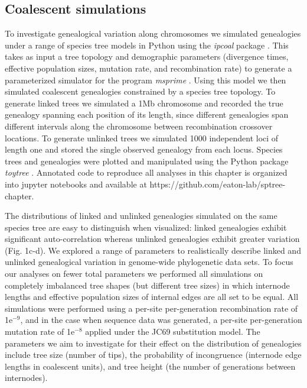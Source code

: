 \documentclass[11pt]{article}
\begin{document}


\subsection{Coalescent simulations}
To investigate genealogical variation along chromosomes we simulated genealogies under a range of species tree models in Python using the \emph{ipcoal} package \citep{mckenzie_ipcoal_2020}. This takes as input a tree topology and demographic parameters (divergence times, effective population sizes, mutation rate, and recombination rate) to generate a parameterized simulator for the program \emph{msprime} \citep{kelleher_efficient_2016}. Using this model we then simulated coalescent genealogies constrained by a species tree topology. To generate linked trees we simulated a 1Mb chromosome and recorded the true genealogy spanning each position of its length, since different genealogies span different intervals along the chromosome between recombination crossover locations. To generate unlinked trees we simulated 1000 independent loci of length one and stored the single observed genealogy from each locus. Species trees and genealogies were plotted and manipulated using the Python package \emph{toytree} \citep{eaton_toytree_2020}. Annotated code to reproduce all analyses in this chapter is organized into jupyter notebooks and available at https://github.com/eaton-lab/sptree-chapter.

The distributions of linked and unlinked genealogies simulated on the same species tree are easy to distinguish when visualized: linked genealogies exhibit significant auto-correlation whereas unlinked genealogies exhibit greater variation (Fig. 1c-d). We explored a range of parameters to realistically describe linked and unlinked genealogical variation in genome-wide phylogenetic data sets. To focus our analyses on fewer total parameters we performed all simulations on completely imbalanced tree shapes (but different tree sizes) in which internode lengths and effective population sizes of internal edges are all set to be equal. All simulations were performed using a per-site per-generation recombination rate of 1e$^{-9}$, and in the case when sequence data was generated, a per-site per-generation mutation rate of 1e$^{-8}$ applied under the JC69 substitution model. The parameters we aim to investigate for their effect on the distribution of genealogies include tree size (number of tips), the probability of incongruence (internode edge lengths in coalescent units), and tree height (the number of generations between internodes). 
\end{document}
